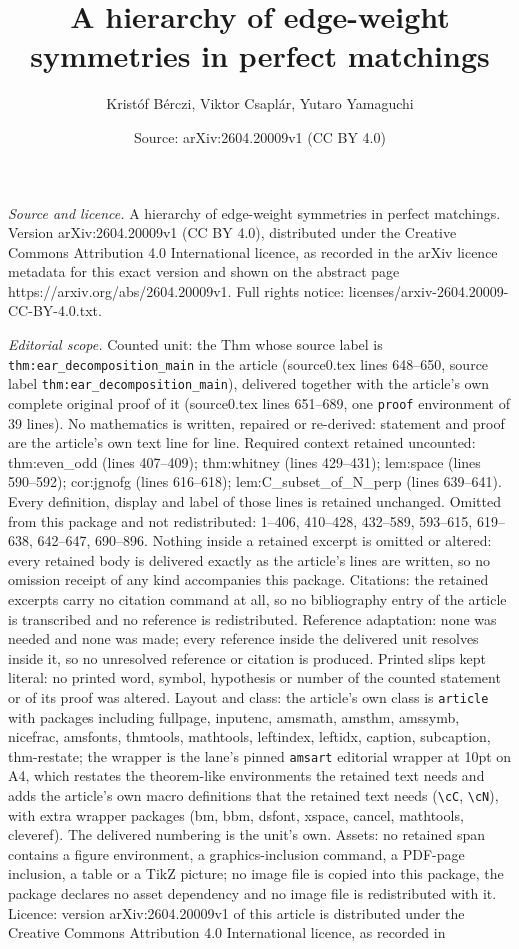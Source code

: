 \documentclass[10pt,a4paper]{amsart}
\title[A hierarchy of edge-weight symmetries in perfect matchings]{A hierarchy of edge-weight symmetries in perfect matchings}
\author{Krist\'of B\'erczi, Viktor Csapl\'ar, Yutaro Yamaguchi}
\date{Source: arXiv:2604.20009v1 (CC BY 4.0)}
\begin{document}
\maketitle

\noindent\emph{Source and licence.} A hierarchy of edge-weight symmetries in perfect matchings. Version arXiv:2604.20009v1 (CC BY 4.0), distributed under the Creative Commons Attribution 4.0 International licence, as recorded in the arXiv licence metadata for this exact version and shown on the abstract page https://arxiv.org/abs/2604.20009v1. Full rights notice: licenses/arxiv-2604.20009-CC-BY-4.0.txt.\par\smallskip

\noindent\textit{Editorial scope.} Counted unit: the Thm whose source label is \texttt{thm:ear\_decomposition\_main} in the article (source0.tex lines 648--650, source label \texttt{thm:ear\_decomposition\_main}), delivered together with the article's own complete original proof of it (source0.tex lines 651--689, one \texttt{proof} environment of 39 lines). No mathematics is written, repaired or re-derived: statement and proof are the article's own text line for line. Required context retained uncounted: thm:even\_odd (lines 407--409); thm:whitney (lines 429--431); lem:space (lines 590--592); cor:jgnofg (lines 616--618); lem:C\_subset\_of\_N\_perp (lines 639--641). Every definition, display and label of those lines is retained unchanged. Omitted from this package and not redistributed: 1--406, 410--428, 432--589, 593--615, 619--638, 642--647, 690--896. Nothing inside a retained excerpt is omitted or altered: every retained body is delivered exactly as the article's lines are written, so no omission receipt of any kind accompanies this package. Citations: the retained excerpts carry no citation command at all, so no bibliography entry of the article is transcribed and no reference is redistributed. Reference adaptation: none was needed and none was made; every reference inside the delivered unit resolves inside it, so no unresolved reference or citation is produced. Printed slips kept literal: no printed word, symbol, hypothesis or number of the counted statement or of its proof was altered. Layout and class: the article's own class is \texttt{article} with packages including fullpage, inputenc, amsmath, amsthm, amssymb, nicefrac, amsfonts, thmtools, mathtools, leftindex, leftidx, caption, subcaption, thm-restate; the wrapper is the lane's pinned \texttt{amsart} editorial wrapper at 10pt on A4, which restates the theorem-like environments the retained text needs and adds the article's own macro definitions that the retained text needs (\texttt{\textbackslash cC}, \texttt{\textbackslash cN}), with extra wrapper packages (bm, bbm, dsfont, xspace, cancel, mathtools, cleveref). The delivered numbering is the unit's own. Assets: no retained span contains a figure environment, a graphics-inclusion command, a PDF-page inclusion, a table or a TikZ picture; no image file is copied into this package, the package declares no asset dependency and no image file is redistributed with it. Licence: version arXiv:2604.20009v1 of this article is distributed under the Creative Commons Attribution 4.0 International licence, as recorded in 
\end{document}
